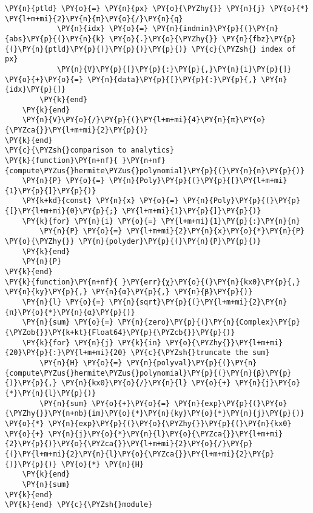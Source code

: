 \begin{Verbatim}[commandchars=\\\{\}]
            \PY{n}{ptld} \PY{o}{=} \PY{n}{px} \PY{o}{\PYZhy{}} \PY{n}{j} \PY{o}{*} \PY{l+m+mi}{2}\PY{n}{π}\PY{o}{/}\PY{n}{q}
            \PY{n}{idx} \PY{o}{=} \PY{n}{indmin}\PY{p}{(}\PY{n}{abs}\PY{p}{(}\PY{n}{k} \PY{o}{.}\PY{o}{\PYZhy{}} \PY{n}{fbz}\PY{p}{(}\PY{n}{ptld}\PY{p}{)}\PY{p}{)}\PY{p}{)} \PY{c}{\PYZsh{} index of px}
            \PY{n}{V}\PY{p}{[}\PY{p}{:}\PY{p}{,}\PY{n}{i}\PY{p}{]} \PY{o}{+}\PY{o}{=} \PY{n}{data}\PY{p}{[}\PY{p}{:}\PY{p}{,} \PY{n}{idx}\PY{p}{]}
        \PY{k}{end}
    \PY{k}{end}
    \PY{n}{V}\PY{o}{/}\PY{p}{(}\PY{l+m+mi}{4}\PY{n}{π}\PY{o}{\PYZca{}}\PY{l+m+mi}{2}\PY{p}{)}
\PY{k}{end}
\PY{c}{\PYZsh{}comparison to analytics}
\PY{k}{function}\PY{n+nf}{ }\PY{n+nf}{compute\PYZus{}hermite\PYZus{}polynomial}\PY{p}{(}\PY{n}{n}\PY{p}{)}
    \PY{n}{P} \PY{o}{=} \PY{n}{Poly}\PY{p}{(}\PY{p}{[}\PY{l+m+mi}{1}\PY{p}{]}\PY{p}{)}
    \PY{k+kd}{const} \PY{n}{x} \PY{o}{=} \PY{n}{Poly}\PY{p}{(}\PY{p}{[}\PY{l+m+mi}{0}\PY{p}{;} \PY{l+m+mi}{1}\PY{p}{]}\PY{p}{)}
    \PY{k}{for} \PY{n}{i} \PY{o}{=} \PY{l+m+mi}{1}\PY{p}{:}\PY{n}{n}
        \PY{n}{P} \PY{o}{=} \PY{l+m+mi}{2}\PY{n}{x}\PY{o}{*}\PY{n}{P} \PY{o}{\PYZhy{}} \PY{n}{polyder}\PY{p}{(}\PY{n}{P}\PY{p}{)}
    \PY{k}{end}
    \PY{n}{P}
\PY{k}{end}
\PY{k}{function}\PY{n+nf}{ }\PY{err}{χ}\PY{o}{(}\PY{n}{kx0}\PY{p}{,} \PY{n}{ky}\PY{p}{,} \PY{n}{α}\PY{p}{,} \PY{n}{β}\PY{p}{)}
    \PY{n}{l} \PY{o}{=} \PY{n}{sqrt}\PY{p}{(}\PY{l+m+mi}{2}\PY{n}{π}\PY{o}{*}\PY{n}{α}\PY{p}{)}
    \PY{n}{sum} \PY{o}{=} \PY{n}{zero}\PY{p}{(}\PY{n}{Complex}\PY{p}{\PYZob{}}\PY{k+kt}{Float64}\PY{p}{\PYZcb{}}\PY{p}{)}
    \PY{k}{for} \PY{n}{j} \PY{k}{in} \PY{o}{\PYZhy{}}\PY{l+m+mi}{20}\PY{p}{:}\PY{l+m+mi}{20} \PY{c}{\PYZsh{}truncate the sum}
        \PY{n}{H} \PY{o}{=} \PY{n}{polyval}\PY{p}{(}\PY{n}{compute\PYZus{}hermite\PYZus{}polynomial}\PY{p}{(}\PY{n}{β}\PY{p}{)}\PY{p}{,} \PY{n}{kx0}\PY{o}{/}\PY{n}{l} \PY{o}{+} \PY{n}{j}\PY{o}{*}\PY{n}{l}\PY{p}{)}
        \PY{n}{sum} \PY{o}{+}\PY{o}{=} \PY{n}{exp}\PY{p}{(}\PY{o}{\PYZhy{}}\PY{n+nb}{im}\PY{o}{*}\PY{n}{ky}\PY{o}{*}\PY{n}{j}\PY{p}{)} \PY{o}{*} \PY{n}{exp}\PY{p}{(}\PY{o}{\PYZhy{}}\PY{p}{(}\PY{n}{kx0} \PY{o}{+} \PY{n}{j}\PY{o}{*}\PY{n}{l}\PY{o}{\PYZca{}}\PY{l+m+mi}{2}\PY{p}{)}\PY{o}{\PYZca{}}\PY{l+m+mi}{2}\PY{o}{/}\PY{p}{(}\PY{l+m+mi}{2}\PY{n}{l}\PY{o}{\PYZca{}}\PY{l+m+mi}{2}\PY{p}{)}\PY{p}{)} \PY{o}{*} \PY{n}{H}
    \PY{k}{end}
    \PY{n}{sum}
\PY{k}{end}
\PY{k}{end} \PY{c}{\PYZsh{}module}
\end{Verbatim}

